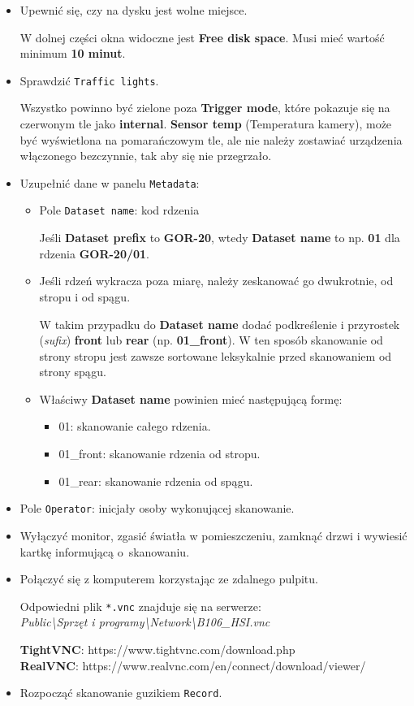 \documentclass[
  letterpaper,
  DIV=11,
  numbers=noendperiod]{scrreprt}
\providecommand{\tightlist}{%
  \setlength{\itemsep}{0pt}\setlength{\parskip}{0pt}}\usepackage{longtable,booktabs,array}
\begin{document}
\begin{itemize}
\item
  Upewnić się, czy na dysku jest wolne miejsce.

  W dolnej części okna widoczne jest \textbf{Free disk space}. Musi mieć
  wartość minimum \textbf{10 minut}.
\item
  Sprawdzić \texttt{Traffic\ lights}.

  Wszystko powinno być zielone poza \textbf{Trigger mode}, które
  pokazuje się na czerwonym tle jako \textbf{internal}. \textbf{Sensor
  temp} (Temperatura kamery), może być wyświetlona na pomarańczowym tle,
  ale nie należy zostawiać urządzenia włączonego bezczynnie, tak aby się
  nie przegrzało.
\item
  Uzupełnić dane w panelu \texttt{Metadata}:

  \begin{itemize}
  \item
    Pole \texttt{Dataset\ name}: kod rdzenia

    Jeśli \textbf{Dataset prefix} to \textbf{GOR-20}, wtedy
    \textbf{Dataset name} to np. \textbf{01} dla rdzenia
    \textbf{GOR-20/01}.
  \item
    Jeśli rdzeń wykracza poza miarę, należy zeskanować go dwukrotnie, od
    stropu i od spągu.

    W takim przypadku do \textbf{Dataset name} dodać podkreślenie i
    przyrostek (\emph{sufix}) \textbf{front} lub \textbf{rear} (np.
    \textbf{01\_front}). W ten sposób skanowanie od strony stropu jest
    zawsze sortowane leksykalnie przed skanowaniem od strony spągu.
  \item
    Właściwy \textbf{Dataset name} powinien mieć następującą formę:

    \begin{itemize}
    \tightlist
    \item
      01: skanowanie całego rdzenia.
    \item
      01\_front: skanowanie rdzenia od stropu.
    \item
      01\_rear: skanowanie rdzenia od spągu.
    \end{itemize}
  \end{itemize}
\item
  Pole \texttt{Operator}: inicjały osoby wykonującej skanowanie.
\item
  Wyłączyć monitor, zgasić światła w pomieszczeniu, zamknąć drzwi i
  wywiesić kartkę informującą o~skanowaniu.
\item
  Połączyć się z komputerem korzystając ze zdalnego pulpitu.

  Odpowiedni plik \texttt{*.vnc} znajduje się na serwerze:\\
  \emph{Public\textbackslash Sprzęt i
  programy\textbackslash Network\textbackslash B106\_HSI.vnc}

  \textbf{TightVNC}: https://www.tightvnc.com/download.php\\
  \textbf{RealVNC}: https://www.realvnc.com/en/connect/download/viewer/
\item
  Rozpocząć skanowanie guzikiem \texttt{Record}.
\end{itemize}
\end{document}
